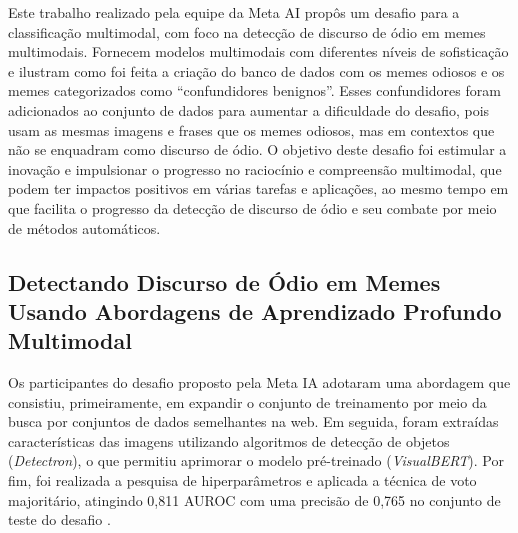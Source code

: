 Este trabalho realizado pela equipe da Meta AI \cite{ArticleHatefulMemesChallenge2021} propôs um desafio para a classificação multimodal, com foco na detecção de discurso de ódio em memes multimodais. Fornecem modelos multimodais com diferentes níveis de sofisticação e ilustram como foi feita a criação do banco de dados com os memes odiosos e os memes categorizados como “confundidores benignos”. Esses confundidores foram adicionados ao conjunto de dados para aumentar a dificuldade do desafio, pois usam as mesmas imagens e frases que os memes odiosos, mas em contextos que não se enquadram como discurso de ódio. O objetivo deste desafio foi estimular a inovação e impulsionar o progresso no raciocínio e compreensão multimodal, que podem ter impactos positivos em várias tarefas e aplicações, ao mesmo tempo em que facilita o progresso da detecção de discurso de ódio e seu combate por meio de métodos automáticos.

\subsection{Detectando Discurso de Ódio em Memes Usando Abordagens de Aprendizado Profundo Multimodal} 

Os participantes do desafio proposto pela Meta IA adotaram uma abordagem que consistiu, primeiramente, em expandir o conjunto de treinamento por meio da busca por conjuntos de dados semelhantes na web. Em seguida, foram extraídas características das imagens utilizando algoritmos de detecção de objetos (\textit{Detectron}), o que permitiu aprimorar o modelo pré-treinado (\textit{VisualBERT}). Por fim, foi realizada a pesquisa de hiperparâmetros e aplicada a técnica de voto majoritário, atingindo 0,811 AUROC com uma precisão de 0,765 no conjunto de teste do desafio \cite{velioglu2020hateful}.